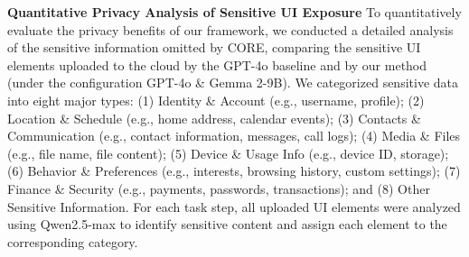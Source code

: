 \textbf{Quantitative Privacy Analysis of Sensitive UI Exposure}
To quantitatively evaluate the privacy benefits of our framework, we conducted a detailed analysis of the sensitive information omitted by CORE, comparing the sensitive UI elements uploaded to the cloud by the GPT-4o baseline and by our method (under the configuration GPT-4o \& Gemma 2-9B). We categorized sensitive data into eight major types: 
(1) Identity \& Account (e.g., username, profile); 
(2) Location \& Schedule (e.g., home address, calendar events); 
(3) Contacts \& Communication (e.g., contact information, messages, call logs); 
(4) Media \& Files (e.g., file name, file content); 
(5) Device \& Usage Info (e.g., device ID, storage); 
(6) Behavior \& Preferences (e.g., interests, browsing history, custom settings); 
(7) Finance \& Security (e.g., payments, passwords, transactions); and 
(8) Other Sensitive Information. For each task step, all uploaded UI elements were analyzed using Qwen2.5-max to identify sensitive content and assign each element to the corresponding category.

\begin{table}[htbp]
  \caption{Comparison of uploaded sensitive UI elements between the GPT-4o baseline and our CORE under two datasets.}
  \label{tab:privacy_reduction}
  \centering
\end{table}

